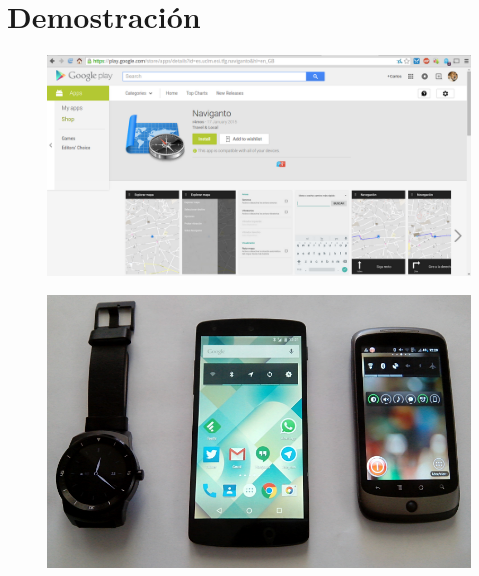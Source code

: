 \section{Demostración}

\begin{slide}
  \begin{figure}[!h]
    \begin{center}
      \includegraphics[height=0.8\textheight]{img/googleplay.png}
    \end{center}
  \end{figure}
\end{slide}

\begin{slide}
  \begin{figure}[!h]
    \begin{center}
      \includegraphics[height=0.7\textheight]{img/hardware.png}
    \end{center}
  \end{figure}
\end{slide}

%

